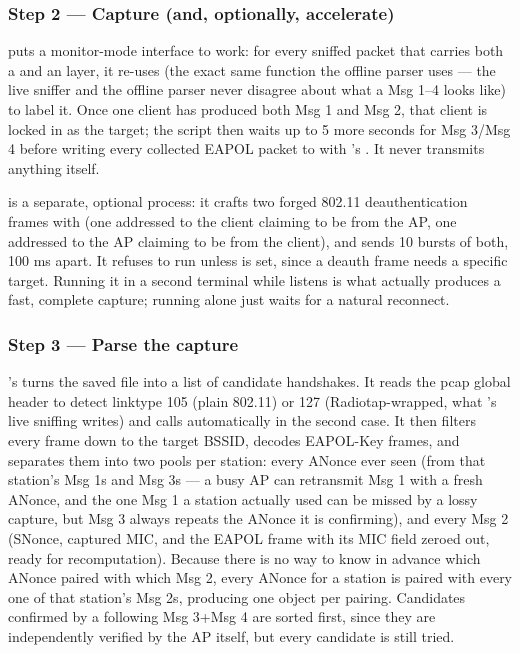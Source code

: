 \subsubsection{Step 2 --- Capture (and, optionally, accelerate)}
 puts a monitor-mode interface to work: for every sniffed packet that carries both a  and an  layer, it re-uses  (the exact same function the offline parser uses --- the live sniffer and the offline parser never disagree about what a Msg 1--4 looks like) to label it. Once one client has produced both Msg 1 and Msg 2, that client is locked in as the target; the script then waits up to 5 more seconds for Msg 3/Msg 4 before writing every collected EAPOL packet to  with 's . It never transmits anything itself.

 is a separate, optional process: it crafts two forged 802.11 deauthentication frames with  (one addressed to the client claiming to be from the AP, one addressed to the AP claiming to be from the client), and sends 10 bursts of both, 100 ms apart. It refuses to run unless  is set, since a deauth frame needs a specific target. Running it in a second terminal while  listens is what actually produces a fast, complete capture; running  alone just waits for a natural reconnect.

\subsubsection{Step 3 --- Parse the capture}
's  turns the saved file into a list of candidate handshakes. It reads the pcap global header to detect linktype 105 (plain 802.11) or 127 (Radiotap-wrapped, what 's live  sniffing writes) and calls  automatically in the second case. It then filters every frame down to the target BSSID, decodes EAPOL-Key frames, and separates them into two pools per station: every ANonce ever seen (from that station's Msg 1s and Msg 3s --- a busy AP can retransmit Msg 1 with a fresh ANonce, and the one Msg 1 a station actually used can be missed by a lossy capture, but Msg 3 always repeats the ANonce it is confirming), and every Msg 2 (SNonce, captured MIC, and the EAPOL frame with its MIC field zeroed out, ready for recomputation). Because there is no way to know in advance which ANonce paired with which Msg 2, every ANonce for a station is paired with every one of that station's Msg 2s, producing one  object per pairing. Candidates confirmed by a following Msg 3+Msg 4 are sorted first, since they are independently verified by the AP itself, but every candidate is still tried.

